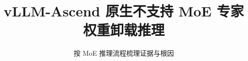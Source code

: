 \documentclass[aspectratio=169,10pt]{beamer}
\title{vLLM-Ascend 原生不支持 MoE 专家权重卸载推理}
\subtitle{按 MoE 推理流程梳理证据与根因}
\author{}
\date{}
\newcommand{\keypoint}[1]{\textbf{\textcolor{AccentRed}{#1}}}
\newcommand{\src}[1]{\texttt{\scriptsize\detokenize{#1}}}
\begin{document}
\begin{frame}
  \titlepage
  \vspace{-1.1em}
\end{frame}



\end{document}
